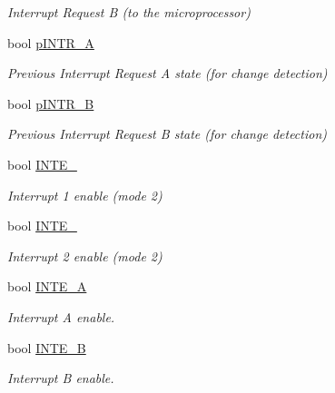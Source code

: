 \begin{DoxyCompactItemize}
\begin{DoxyCompactList}\small\item\em Interrupt Request B (to the microprocessor) \end{DoxyCompactList}\item 
\hypertarget{classIntel8255_a3f0b361bdd3b3e17f2e4155a562e97f6}{bool \hyperlink{classIntel8255_a3f0b361bdd3b3e17f2e4155a562e97f6}{p\-I\-N\-T\-R\-\_\-\-A}}\label{classIntel8255_a3f0b361bdd3b3e17f2e4155a562e97f6}

\begin{DoxyCompactList}\small\item\em Previous Interrupt Request A state (for change detection) \end{DoxyCompactList}\item 
\hypertarget{classIntel8255_a20fdff00b2ce0c6ff6853a812cb4bd9d}{bool \hyperlink{classIntel8255_a20fdff00b2ce0c6ff6853a812cb4bd9d}{p\-I\-N\-T\-R\-\_\-\-B}}\label{classIntel8255_a20fdff00b2ce0c6ff6853a812cb4bd9d}

\begin{DoxyCompactList}\small\item\em Previous Interrupt Request B state (for change detection) \end{DoxyCompactList}\item 
\hypertarget{classIntel8255_a86ff75a1d1c588498770aef868af1646}{bool \hyperlink{classIntel8255_a86ff75a1d1c588498770aef868af1646}{I\-N\-T\-E\-\_}}\label{classIntel8255_a86ff75a1d1c588498770aef868af1646}

\begin{DoxyCompactList}\small\item\em Interrupt 1 enable (mode 2) \end{DoxyCompactList}\item 
\hypertarget{classIntel8255_a3c4ae09573e23e4d7ebe5fd5974e7237}{bool \hyperlink{classIntel8255_a3c4ae09573e23e4d7ebe5fd5974e7237}{I\-N\-T\-E\-\_}}\label{classIntel8255_a3c4ae09573e23e4d7ebe5fd5974e7237}

\begin{DoxyCompactList}\small\item\em Interrupt 2 enable (mode 2) \end{DoxyCompactList}\item 
\hypertarget{classIntel8255_acb70507c44eaf7feb0e9d27a6a4546e8}{bool \hyperlink{classIntel8255_acb70507c44eaf7feb0e9d27a6a4546e8}{I\-N\-T\-E\-\_\-\-A}}\label{classIntel8255_acb70507c44eaf7feb0e9d27a6a4546e8}

\begin{DoxyCompactList}\small\item\em Interrupt A enable. \end{DoxyCompactList}\item 
\hypertarget{classIntel8255_a8417a1099c39abfa19d027e6d341bb7b}{bool \hyperlink{classIntel8255_a8417a1099c39abfa19d027e6d341bb7b}{I\-N\-T\-E\-\_\-\-B}}\label{classIntel8255_a8417a1099c39abfa19d027e6d341bb7b}

\begin{DoxyCompactList}\small\item\em Interrupt B enable. \end{DoxyCompactList}\end{DoxyCompactItemize}
